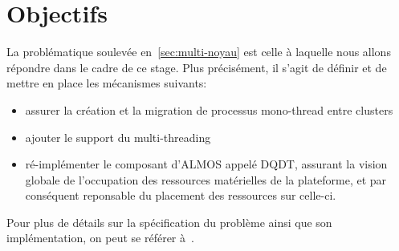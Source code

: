   \section{Objectifs}

    La problématique soulevée en~\ref{sec:multi-noyau} est celle à laquelle nous
    allons répondre dans le cadre de ce stage. Plus précisément, il s'agit de
    définir et de mettre en place les mécanismes suivants:

    \begin{itemize}
      \item assurer la création et la migration de processus mono-thread entre
        clusters
      \item ajouter le support du multi-threading
      \item ré-implémenter le composant d'ALMOS appelé
        DQDT, assurant
        la vision globale de l'occupation des ressources matérielles de la
        plateforme, et par conséquent reponsable du placement des ressources sur
        celle-ci.
    \end{itemize}

    Pour plus de détails sur la spécification du problème ainsi que son
    implémentation, on peut se référer à~\citep{peneau2015almos}.

